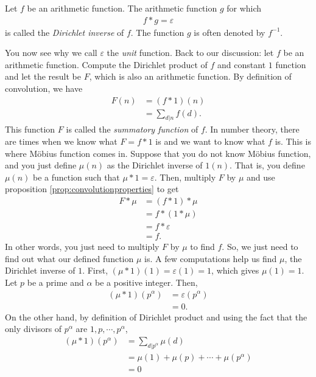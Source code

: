\documentclass[12pt]{subfile}
\begin{document}
		\begin{definition}
			Let $f$ be an arithmetic function. The arithmetic function $g$ for which
				\begin{align*}
					f \ast g = \varepsilon
				\end{align*}
			is called the \textit{Dirichlet inverse} of $f$. The function $g$ is often denoted by $f^{-1}$.
		\end{definition}
	You now see why we call $\varepsilon$ the \textit{unit} function. Back to our discussion: let $f$ be an arithmetic function. Compute the Dirichlet product of $f$ and constant $1$ function and let the result be $F$, which is also an arithmetic function. By definition of convolution, we have
		\begin{align*}
			F(n) &= (f\ast 1)(n)\\
			     &= \sum_{d|n} f(d).
		\end{align*}
	This function $F$ is called the \textit{summatory function} of $f$. In number theory, there are times when we know what $F=f\ast 1$ is and we want to know what $f$ is. This is where M\"{o}bius function comes in. Suppose that you do not know M\"{o}bius function, and you just define $\mu(n)$ as the Dirichlet inverse of $1(n)$. That is, you define $\mu(n)$ be a function such that $\mu \ast 1 = \varepsilon$. Then, multiply $F$ by $\mu$ and use proposition \ref{prop:convolutionproperties} to get
		\begin{align*}
			F \ast \mu &= (f \ast 1) \ast \mu\\
					   &= f \ast (1 \ast \mu)\\
					   &= f \ast \varepsilon\\
					   &=f.
		\end{align*}
	In other words, you just need to multiply $F$ by $\mu$ to find $f$. So, we just need to find out what our defined function $\mu$ is. A few computations help us find $\mu$, the Dirichlet inverse of $1$. First, $(\mu \ast 1)(1)=\varepsilon(1)=1$, which gives $\mu(1)=1$. Let $p$ be a prime and $\alpha$ be a positive integer. Then,
		\begin{align*}
			(\mu \ast 1)(p^\alpha) &= \varepsilon(p^\alpha)\\
							   &= 0.
		\end{align*}
	On the other hand, by definition of Dirichlet product and using the fact that the only divisors of $p^\alpha$ are $1,p,\cdots,p^\alpha$,
		\begin{align*}
			(\mu \ast 1)(p^\alpha) &= \sum_{d|p^\alpha}\mu(d)\\
							   &= \mu(1) + \mu(p) + \cdots + \mu(p^\alpha)\\
							   &= 0
		\end{align*}
\end{document}
